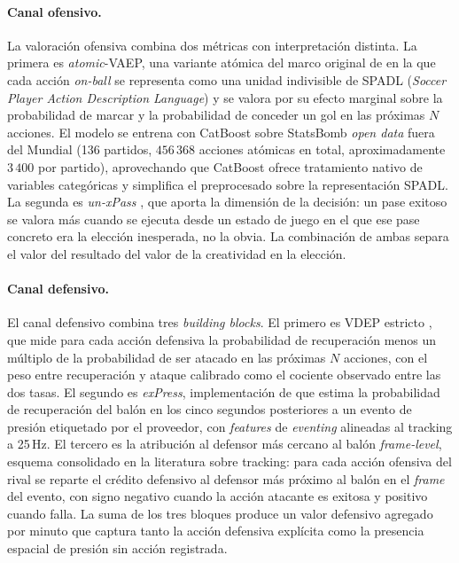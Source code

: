\paragraph{Canal ofensivo.}
La valoración ofensiva combina dos métricas con interpretación
distinta. La primera es \textit{atomic}-VAEP, una variante atómica
del marco original de \textcite{Decroos2019VAEP} en la que cada
acción \textit{on-ball} se representa como una unidad indivisible de
SPADL (\textit{Soccer Player Action Description Language}) y se
valora por su efecto marginal sobre la probabilidad de marcar y la
probabilidad de conceder un gol en las próximas $N$ acciones. El
modelo se entrena con CatBoost sobre StatsBomb \textit{open data}
fuera del Mundial (136 partidos, $456\,368$ acciones atómicas en
total, aproximadamente $3\,400$ por partido), aprovechando que
CatBoost ofrece tratamiento nativo de variables categóricas y
simplifica el preprocesado sobre la representación SPADL. La segunda es \textit{un-xPass}
\parencite{Robberechts2023unxPass}, que aporta la dimensión de la
decisión: un pase exitoso se valora más cuando se ejecuta desde un
estado de juego en el que ese pase concreto era la elección
inesperada, no la obvia. La combinación de ambas separa el valor
del resultado del valor de la creatividad en la elección.

\paragraph{Canal defensivo.}
El canal defensivo combina tres \textit{building blocks}. El primero
es VDEP estricto \parencite{Toda2022VDEP}, que mide para cada acción
defensiva la probabilidad de recuperación menos un múltiplo de la
probabilidad de ser atacado en las próximas $N$ acciones, con el
peso entre recuperación y ataque calibrado como el cociente
observado entre las dos tasas. El segundo es \textit{exPress},
implementación de \textcite{Lee2025exPress} que estima la
probabilidad de recuperación del balón en los cinco segundos
posteriores a un evento de presión etiquetado por el proveedor, con
\textit{features} de \textit{eventing} alineadas al tracking a
25\,Hz. El tercero es la atribución al defensor más cercano al balón
\textit{frame-level}, esquema consolidado en la literatura sobre
tracking: para cada acción ofensiva del rival se reparte el crédito
defensivo al defensor más próximo al balón en el \textit{frame} del
evento, con signo negativo cuando la acción atacante es exitosa y
positivo cuando falla. La suma de los tres bloques produce un valor defensivo
agregado por minuto que captura tanto la acción defensiva explícita
como la presencia espacial de presión sin acción registrada.

